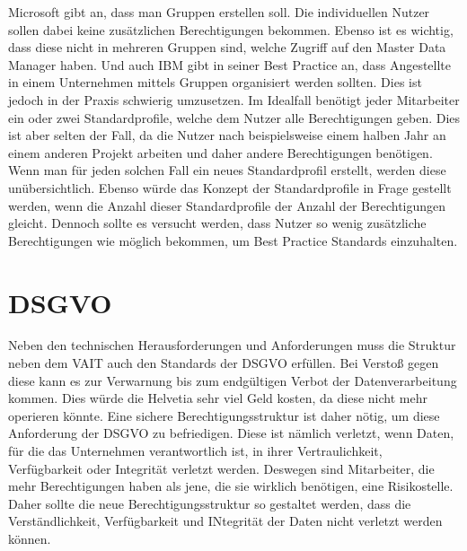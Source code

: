 \newline
\newline
Microsoft gibt an, dass man Gruppen erstellen soll.
Die individuellen Nutzer sollen dabei keine zusätzlichen Berechtigungen bekommen.
Ebenso ist es wichtig, dass diese nicht in mehreren Gruppen sind, welche Zugriff auf den Master Data Manager haben.
Und auch IBM gibt in seiner Best Practice an, dass Angestellte in einem Unternehmen mittels Gruppen organisiert werden sollten. \cite{IBMGroup}
\newline
Dies ist jedoch in der Praxis schwierig umzusetzen.
Im Idealfall benötigt jeder Mitarbeiter ein oder zwei Standardprofile, welche dem Nutzer alle Berechtigungen geben.
Dies ist aber selten der Fall, da die Nutzer nach beispielsweise einem halben Jahr an einem anderen Projekt arbeiten und daher andere Berechtigungen benötigen.
Wenn man für jeden solchen Fall ein neues Standardprofil erstellt, werden diese unübersichtlich.
Ebenso würde das Konzept der Standardprofile in Frage gestellt werden, wenn die Anzahl dieser Standardprofile der Anzahl der Berechtigungen gleicht.
Dennoch sollte es versucht werden, dass Nutzer so wenig zusätzliche Berechtigungen wie möglich bekommen, um Best Practice Standards einzuhalten. 

\section{DSGVO}
\label{sec:chapter04:DSGVO}
Neben den technischen Herausforderungen und Anforderungen muss die Struktur neben dem \ac{VAIT} auch den Standards der \ac{DSGVO} erfüllen.
Bei Verstoß gegen diese kann es zur Verwarnung bis zum endgültigen Verbot der Datenverarbeitung kommen. \cite{EuroK}
Dies würde die Helvetia sehr viel Geld kosten, da diese nicht mehr operieren könnte.
\newline
Eine sichere Berechtigungsstruktur ist daher nötig, um diese Anforderung der \ac{DSGVO} zu befriedigen.
Diese ist nämlich verletzt, wenn Daten, für die das Unternehmen verantwortlich ist, in ihrer Vertraulichkeit, Verfügbarkeit oder Integrität verletzt werden.
Deswegen sind Mitarbeiter, die mehr Berechtigungen haben als jene, die sie wirklich benötigen, eine Risikostelle. \cite{EuroW}
\newline
Daher sollte die neue Berechtigungsstruktur so gestaltet werden, dass die Verständlichkeit, Verfügbarkeit und INtegrität der Daten nicht verletzt werden können.

